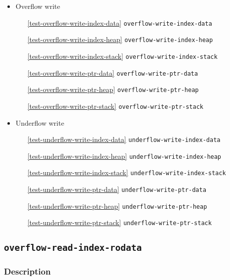 \documentclass[a4paper]{book}
\begin{document}
\begin{itemize}[noitemsep]
\item Overflow write
 \begin{itemize}[noitemsep, nolistsep, leftmargin=1em]
    \item[\ref{test-overflow-write-index-data}]       \texttt{overflow-write-index-data}
    \item[\ref{test-overflow-write-index-heap}]       \texttt{overflow-write-index-heap}
    \item[\ref{test-overflow-write-index-stack}]      \texttt{overflow-write-index-stack}
    \item[\ref{test-overflow-write-ptr-data}]         \texttt{overflow-write-ptr-data}
    \item[\ref{test-overflow-write-ptr-heap}]         \texttt{overflow-write-ptr-heap}
    \item[\ref{test-overflow-write-ptr-stack}]        \texttt{overflow-write-ptr-stack}
 \end{itemize}

\item Underflow write
 \begin{itemize}[noitemsep, nolistsep, leftmargin=1em]
    \item[\ref{test-underflow-write-index-data}]      \texttt{underflow-write-index-data}
    \item[\ref{test-underflow-write-index-heap}]      \texttt{underflow-write-index-heap}
    \item[\ref{test-underflow-write-index-stack}]     \texttt{underflow-write-index-stack}
    \item[\ref{test-underflow-write-ptr-data}]        \texttt{underflow-write-ptr-data}
    \item[\ref{test-underflow-write-ptr-heap}]        \texttt{underflow-write-ptr-heap}
    \item[\ref{test-underflow-write-ptr-stack}]       \texttt{underflow-write-ptr-stack}
 \end{itemize}

\end{itemize}

\newpage

\subsection{\texttt{overflow-read-index-rodata}}\label{test-overflow-read-index-rodata}

\subsubsection{Description}
\end{document}
